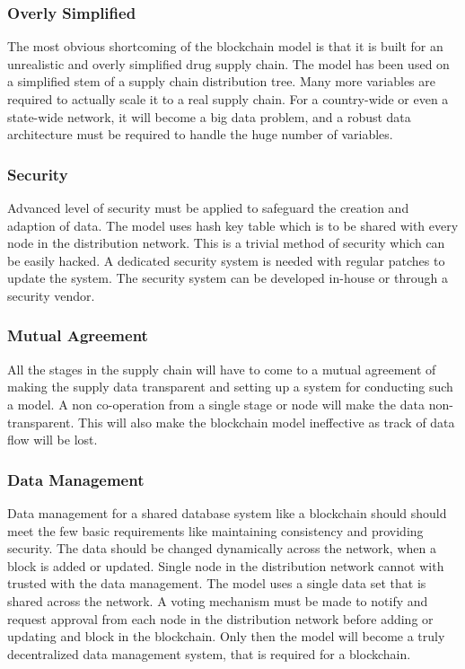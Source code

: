 \documentclass[sigconf]{acmart}
\begin{document}
\subsubsection{Overly Simplified} The most obvious shortcoming of the blockchain model is that it is built for an unrealistic and overly simplified drug supply chain. The model has been used on a simplified stem of a supply chain distribution tree. Many more variables are required to actually scale it to a real supply chain. For a country-wide or even a state-wide network, it will become a big data problem, and a robust data architecture must be required to handle the huge number of variables. 

\subsubsection{Security} Advanced level of security must be applied to safeguard the creation and adaption of data. The model uses hash key table which is to be shared with every node in the distribution network. This is a trivial method of security which can be easily hacked. A dedicated security system is needed with regular patches to update the system. The security system can be developed in-house or through a security vendor. 

\subsubsection{Mutual Agreement} All the stages in the supply chain will have to come to a mutual agreement of making the supply data transparent and setting up a system for conducting such a model. A non co-operation from a single stage or node will make the data non-transparent. This will also make the blockchain model ineffective as track of data flow will be lost. 

\subsubsection{Data Management} Data management for a shared database system like a blockchain should should meet the few basic requirements like maintaining consistency and providing security. The data should be changed dynamically across the network, when a block is added or updated. Single node in the distribution network cannot with trusted with the data management. The model uses a single data set that is shared across the network. A voting mechanism must be made to notify and request approval from each node in the distribution network before adding or updating and block in the blockchain. Only then the model will become a truly decentralized data management system, that is required for a blockchain.
\end{document}
